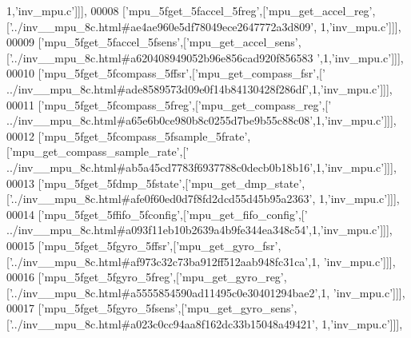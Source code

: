 \begin{DoxyCode}
      1,\textcolor{stringliteral}{'inv\_mpu.c'}]]],
00008   [\textcolor{stringliteral}{'mpu\_5fget\_5faccel\_5freg'},[\textcolor{stringliteral}{'mpu\_get\_accel\_reg'},[\textcolor{stringliteral}{'../inv\_\_mpu\_8c.html#ae4ae960e5df78049ece2647772a3d809'},
      1,\textcolor{stringliteral}{'inv\_mpu.c'}]]],
00009   [\textcolor{stringliteral}{'mpu\_5fget\_5faccel\_5fsens'},[\textcolor{stringliteral}{'mpu\_get\_accel\_sens'},[\textcolor{stringliteral}{'../inv\_\_mpu\_8c.html#a620408949052b96e856cad920f856583
      '},1,\textcolor{stringliteral}{'inv\_mpu.c'}]]],
00010   [\textcolor{stringliteral}{'mpu\_5fget\_5fcompass\_5ffsr'},[\textcolor{stringliteral}{'mpu\_get\_compass\_fsr'},[\textcolor{stringliteral}{'
      ../inv\_\_mpu\_8c.html#ade8589573d09e0f14b84130428f286df'},1,\textcolor{stringliteral}{'inv\_mpu.c'}]]],
00011   [\textcolor{stringliteral}{'mpu\_5fget\_5fcompass\_5freg'},[\textcolor{stringliteral}{'mpu\_get\_compass\_reg'},[\textcolor{stringliteral}{'
      ../inv\_\_mpu\_8c.html#a65e6b0ce980b8c0255d7be9b55c88c08'},1,\textcolor{stringliteral}{'inv\_mpu.c'}]]],
00012   [\textcolor{stringliteral}{'mpu\_5fget\_5fcompass\_5fsample\_5frate'},[\textcolor{stringliteral}{'mpu\_get\_compass\_sample\_rate'},[\textcolor{stringliteral}{'
      ../inv\_\_mpu\_8c.html#ab5a45cd7783f6937788c0decb0b18b16'},1,\textcolor{stringliteral}{'inv\_mpu.c'}]]],
00013   [\textcolor{stringliteral}{'mpu\_5fget\_5fdmp\_5fstate'},[\textcolor{stringliteral}{'mpu\_get\_dmp\_state'},[\textcolor{stringliteral}{'../inv\_\_mpu\_8c.html#afe0f60ed0d7f8fd2dcd55d45b95a2363'},
      1,\textcolor{stringliteral}{'inv\_mpu.c'}]]],
00014   [\textcolor{stringliteral}{'mpu\_5fget\_5ffifo\_5fconfig'},[\textcolor{stringliteral}{'mpu\_get\_fifo\_config'},[\textcolor{stringliteral}{'
      ../inv\_\_mpu\_8c.html#a093f11eb10b2639a4b9fe344ea348c54'},1,\textcolor{stringliteral}{'inv\_mpu.c'}]]],
00015   [\textcolor{stringliteral}{'mpu\_5fget\_5fgyro\_5ffsr'},[\textcolor{stringliteral}{'mpu\_get\_gyro\_fsr'},[\textcolor{stringliteral}{'../inv\_\_mpu\_8c.html#af973c32c73ba912ff512aab948fc31ca'},1,\textcolor{stringliteral}{
      'inv\_mpu.c'}]]],
00016   [\textcolor{stringliteral}{'mpu\_5fget\_5fgyro\_5freg'},[\textcolor{stringliteral}{'mpu\_get\_gyro\_reg'},[\textcolor{stringliteral}{'../inv\_\_mpu\_8c.html#a5555854590ad11495c0e30401294bae2'},1,\textcolor{stringliteral}{
      'inv\_mpu.c'}]]],
00017   [\textcolor{stringliteral}{'mpu\_5fget\_5fgyro\_5fsens'},[\textcolor{stringliteral}{'mpu\_get\_gyro\_sens'},[\textcolor{stringliteral}{'../inv\_\_mpu\_8c.html#a023c0cc94aa8f162dc33b15048a49421'},
      1,\textcolor{stringliteral}{'inv\_mpu.c'}]]],

\end{DoxyCode}
